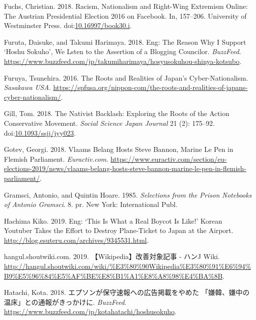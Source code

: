 \documentclass[10pt,british,A4paper,,openany]{memoir}
\begin{document}
\hypertarget{ref-fuchs_racism_2018}{}
Fuchs, Christian. 2018. Racism, Nationalism and Right-Wing Extremism
Online: The Austrian Presidential Election 2016 on Facebook. In,
157--206. University of Westminster Press.
doi:\href{https://doi.org/10.16997/book30.i}{10.16997/book30.i}.

\hypertarget{ref-furuta_eng:_2018}{}
Furuta, Daisuke, and Takumi Harimaya. 2018. Eng: The Reason Why I
Support `Hoshu Sokuho', We Lsten to the Assertion of a Blogging
Councilor. \emph{BuzzFeed}.
\url{https://www.buzzfeed.com/jp/takumiharimaya/hosyusokuhou-shinya-kotsubo}.

\hypertarget{ref-furuya_roots_2016}{}
Furuya, Tsunehira. 2016. The Roots and Realities of Japan's
Cyber-Nationalism. \emph{Sasakawa USA}.
\url{https://spfusa.org/nippon-com/the-roots-and-realities-of-japans-cyber-nationalism/}.

\hypertarget{ref-gill_nativist_2018}{}
Gill, Tom. 2018. The Nativist Backlash: Exploring the Roots of the
Action Conservative Movement. \emph{Social Science Japan Journal} 21
(2): 175--92.
doi:\href{https://doi.org/10.1093/ssjj/jyy023}{10.1093/ssjj/jyy023}.

\hypertarget{ref-gotev_vlaams_2018}{}
Gotev, Georgi. 2018. Vlaams Belang Hosts Steve Bannon, Marine Le Pen in
Flemish Parliament. \emph{Euractiv.com}.
\url{https://www.euractiv.com/section/eu-elections-2019/news/vlaams-belang-hosts-steve-bannon-marine-le-pen-in-flemish-parliament/}.

\hypertarget{ref-gramsci_selections_1985}{}
Gramsci, Antonio, and Quintin Hoare. 1985. \emph{Selections from the
Prison Notebooks of Antonio Gramsci}. 8. pr. New York: International
Publ.

\hypertarget{ref-hachima_kiko_eng:_2019}{}
Hachima Kiko. 2019. Eng: `This Is What a Real Boycot Is Like!' Korean
Youtuber Takes the Effort to Destroy Plane-Ticket to Japan at the
Airport. \url{http://blog.esuteru.com/archives/9345531.html}.

\hypertarget{ref-hangul.shoutwiki.com_wikipedia_2019}{}
hangul.shoutwiki.com. 2019. 【Wikipedia】改善対象記事 - ハンJ Wiki.
\url{http://hangul.shoutwiki.com/wiki/\%E3\%80\%90Wikipedia\%E3\%80\%91\%E6\%94\%B9\%E5\%96\%84\%E5\%AF\%BE\%E8\%B1\%A1\%E8\%A8\%98\%E4\%BA\%8B}.

\hypertarget{ref-hatachi__2018}{}
Hatachi, Kota. 2018. エプソンが保守速報への広告掲載をやめた
「嫌韓、嫌中の温床」との通報がきっかけに. \emph{BuzzFeed}.
\url{https://www.buzzfeed.com/jp/kotahatachi/hoshusokuho}.
\end{document}
